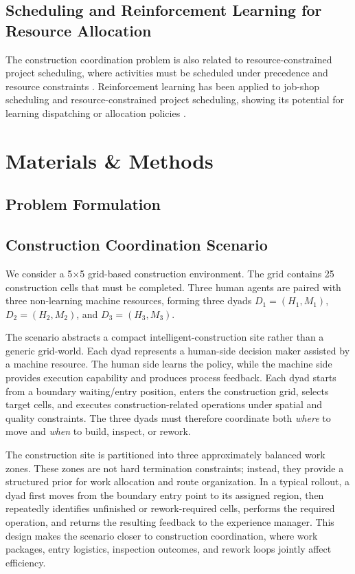 \documentclass[fleqn,10pt]{wlpeerj}
\begin{document}
\subsection{Scheduling and Reinforcement Learning for Resource Allocation}

The construction coordination problem is also related to resource-constrained project scheduling, where activities must be scheduled under precedence and resource constraints \cite{KolischHartmann1999RCPSP,Hartmann2000HeuristicsRCPSP,HartmannBriskorn2010RCPSPSurvey}. Reinforcement learning has been applied to job-shop scheduling and resource-constrained project scheduling, showing its potential for learning dispatching or allocation policies \cite{ZhangDietterich1995JobShopRL,Sung2020RLRCPSP,Cai2024DRLRCPSP}.

\section{Materials \& Methods}
\subsection{Problem Formulation}

\subsection{Construction Coordination Scenario}

We consider a 5$\times$5 grid-based construction environment. The grid contains 25 construction cells that must be completed. Three human agents are paired with three non-learning machine resources, forming three dyads $D_1=(H_1,M_1)$, $D_2=(H_2,M_2)$, and $D_3=(H_3,M_3)$.


The scenario abstracts a compact intelligent-construction site rather than a generic grid-world. Each dyad represents a human-side decision maker assisted by a machine resource. The human side learns the policy, while the machine side provides execution capability and produces process feedback. Each dyad starts from a boundary waiting/entry position, enters the construction grid, selects target cells, and executes construction-related operations under spatial and quality constraints. The three dyads must therefore coordinate both \emph{where} to move and \emph{when} to build, inspect, or rework.

The construction site is partitioned into three approximately balanced work zones. These zones are not hard termination constraints; instead, they provide a structured prior for work allocation and route organization. In a typical rollout, a dyad first moves from the boundary entry point to its assigned region, then repeatedly identifies unfinished or rework-required cells, performs the required operation, and returns the resulting feedback to the experience manager. This design makes the scenario closer to construction coordination, where work packages, entry logistics, inspection outcomes, and rework loops jointly affect efficiency.
\end{document}
